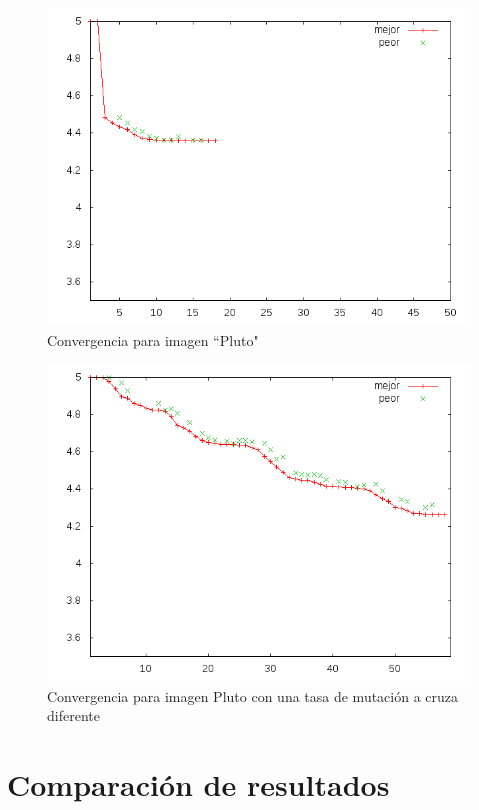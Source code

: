 \begin{figure}[b]
    \includegraphics[width=1.0\textwidth]{plot_pluto}
    \caption{Convergencia para imagen ``Pluto"}
    \label{img:plot-pluto}
\end{figure}

\begin{figure}
    \includegraphics[width=1.0\textwidth]{plot_pluto_tweak}
    \caption{Convergencia para imagen Pluto con una tasa de mutación a cruza diferente}
    \label{img:plot-pluto2}
\end{figure}

\section{Comparación de resultados}

